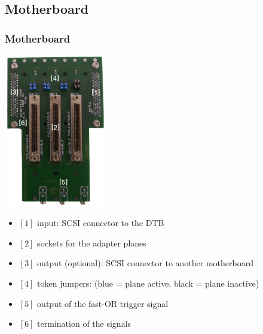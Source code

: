 \documentclass[9pt]{beamer}
\begin{document}
\subsection{Motherboard}
\begin{frame}
	\frametitle{Motherboard}
	\begin{center}
		\begin{minipage}{4.6cm}
			\centering
			\includegraphics[width=4.5cm]{Pics/Motherboard}
		\end{minipage}
		\hspace*{2pt}
		\begin{minipage}{6cm}
			\begin{itemize}
				\item $[1]$ input: SCSI connector to the DTB
				\item $[2]$ sockets for the adapter planes
				\item $[3]$ output (optional): SCSI connector to another motherboard
				\item $[4]$ token jumpers: (blue = plane active, black = plane inactive) 
				\item $[5]$ output of the fast-OR trigger signal 
				\item $[6]$ termination of the signals
			\end{itemize}
		\end{minipage}\no\s
	\end{center}
\end{frame}
\end{document}
